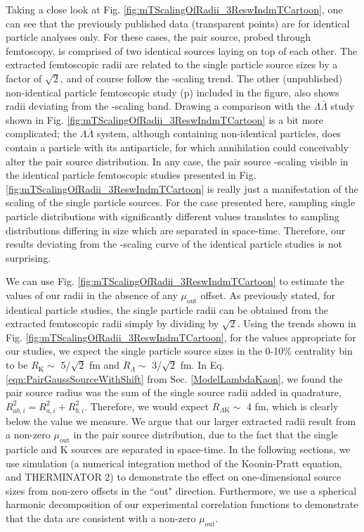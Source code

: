 \documentclass[/home/jesse/Analysis/FemtoAnalysis/AnalysisNotes/AnalysisNoteJBuxton.tex]{subfiles}
\begin{document}
Taking a close look at Fig. \ref{fig:mTScalingOfRadii_3ReswIndmTCartoon}, one can see that the previously published data (transparent points) are for identical particle analyses only.
For these cases, the pair source, probed through femtoscopy, is comprised of two identical sources laying on top of each other.
The extracted femtoscopic radii are related to the single particle source sizes by a factor of $\sqrt{2}$, and of course follow the \mt-scaling trend.
The other (unpublished) non-identical particle femtoscopic study (p\Lam) included in the figure, also shows radii deviating from the \mt-scaling band.
Drawing a comparison with the $\Lambda\bar{\Lambda}$ study shown in Fig. \ref{fig:mTScalingOfRadii_3ReswIndmTCartoon} is a bit more complicated; the $\Lambda\bar{\Lambda}$ system, although containing non-identical particles, does contain a particle with its antiparticle, for which annihilation could conceivably alter the pair source distribution.
In any case, the pair source \mt-scaling visible in the identical particle femtoscopic studies presented in Fig. \ref{fig:mTScalingOfRadii_3ReswIndmTCartoon} is really just a manifestation of the scaling of the single particle sources.
For the case presented here, sampling single particle distributions with significantly different \mt values translates to sampling distributions differing in size which are separated in space-time. 
Therefore, our results deviating from the \mt-scaling curve of the identical particle studies is not surprising.

We can use Fig. \ref{fig:mTScalingOfRadii_3ReswIndmTCartoon} to estimate the values of our \LamK radii in the absence of any $\mu_{\mathrm{out}}$ offset.
As previously stated, for identical particle studies, the single particle radii can be obtained from the extracted femtoscopic radii simply by dividing by $\sqrt{2}$. 
Using the trends shown in Fig. \ref{fig:mTScalingOfRadii_3ReswIndmTCartoon}, for the \mt values appropriate for our studies, we expect the single particle source sizes in the 0-10\% centrality bin to be $R_{\mathrm{K}} \sim$ 5/$\sqrt{2}$ fm and $R_{\Lambda} \sim$ 3/$\sqrt{2}$ fm.
In Eq. \ref{eqn:PairGaussSourceWithShift} from Sec. \ref{ModelLambdaKaon}, we found the pair source radius was the sum of the single source radii added in quadrature, $R_{ab, i}^{2} = R_{a, i}^{2} + R_{b, i}^{2}$.
Therefore, we would expect $R_{\Lambda\mathrm{K}} \sim$ 4 fm, which is clearly below the value we measure.
We argue that our larger extracted radii result from a non-zero $\mu_{\mathrm{out}}$ in the pair source distribution, due to the fact that the single particle \Lam and K sources are separated in space-time.
In the following sections, we use simulation (a numerical integration method of the Koonin-Pratt equation, and THERMINATOR 2) to demonstrate the effect on one-dimensional source sizes from non-zero offsets in the ``out" direction.
Furthermore, we use a spherical harmonic decomposition of our experimental correlation functions to demonstrate that the data are consistent with a non-zero $\mu_{\mathrm{out}}$.
\end{document}
